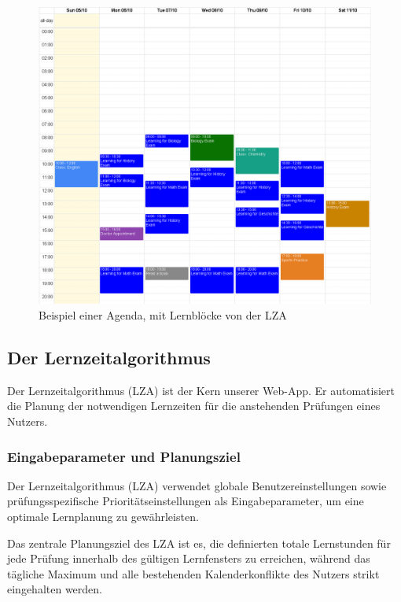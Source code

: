 \documentclass[12pt,a4paper]{report}
\begin{document}
\begin{figure}
    \centering
    \includegraphics[width=\linewidth]{img/agenda.png}
    \caption[Beispiel einer Agenda, mit Lernblöcke von der LZA. Screenshot KantiKoala, 31.10.2025]{Beispiel einer Agenda, mit Lernblöcke von der LZA}
    \label{fig:placeholder}
\end{figure}
\subsection{Der Lernzeitalgorithmus}
Der Lernzeitalgorithmus (LZA) ist der Kern unserer Web-App. Er automatisiert die Planung der notwendigen Lernzeiten für die anstehenden Prüfungen eines Nutzers.

\subsubsection{Eingabeparameter und Planungsziel}

Der Lernzeitalgorithmus (LZA) verwendet globale Benutzereinstellungen sowie prüfungsspezifische Prioritätseinstellungen als Eingabeparameter, um eine optimale Lernplanung zu gewährleisten.

Das zentrale Planungsziel des LZA ist es, die definierten totale Lernstunden für jede Prüfung innerhalb des gültigen Lernfensters zu erreichen, während das tägliche Maximum und alle bestehenden Kalenderkonflikte des Nutzers strikt eingehalten werden.
\end{document}
